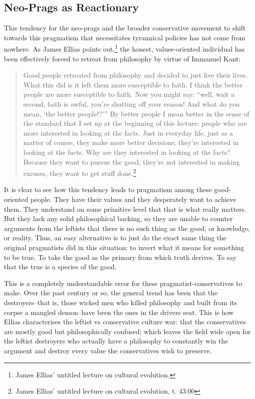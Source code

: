 \documentclass[11pt]{article}
\begin{document}
\subsection{Neo-Prags as Reactionary}
\label{sec:org610bba3}
This tendency for the neo-prags and the broader conservative movement to shift towards this pragmatism that necessitates tyrannical policies has not come from nowhere. As James Ellias points out,\footnote{James Ellias' untitled lecture on cultural evolution.} the honest, values-oriented individual has been effectively forced to retreat from philosophy by virtue of Immanuel Kant:
\begin{quote}
Good people retreated from philosophy and decided to just live their lives. What this did is it left them more susceptible to faith. I think the better people are more susceptible to faith. Now you might say: ``well, wait a second, faith is awful, you're shutting off your reason! And what do you mean, `the better people!?''' By better people I mean better in the sense of the standard that I set up at the beginning of this lecture: people who are more interested in looking at the facts. Just in everyday life, just as a matter of course, they make more better decisions; they're interested in looking at the facts. Why are they interested in looking at the facts? Because they want to pursue the good, they're not interested in making excuses, they want to get stuff done.\footnote{James Ellias' untitled lecture on cultural evolution, t. 43:00}
\end{quote}

It is clear to see how this tendency leads to pragmatism among these good-oriented people. They have their values and they desperately want to achieve them. They understand on some primitive level that that is what really matters. But they lack any solid philosophical backing, so they are unable to counter arguments from the leftists that there is no such thing as the good, or knowledge, or reality. Thus, an easy alternative is to just do the exact same thing the original pragmatists did in this situation: to invert what it means for something to be true. To take the good as the primary from which truth derives. To say that the true is a species of the good.

This is a completely understandable error for these pragmatist-conservatives to make. Over the past century or so, the general trend has been that the destroyers--that is, those wicked men who killed philosophy and built from its corpse a mangled demon--have been the ones in the drivers seat. This is how Ellias characterises the leftist vs conservative culture war: that the conservatives are mostly good but philosophically confused; which leaves the field wide open for the leftist destroyers who actually have a philosophy to constantly win the argument and destroy every value the conservatives wish to preserve.
\end{document}
